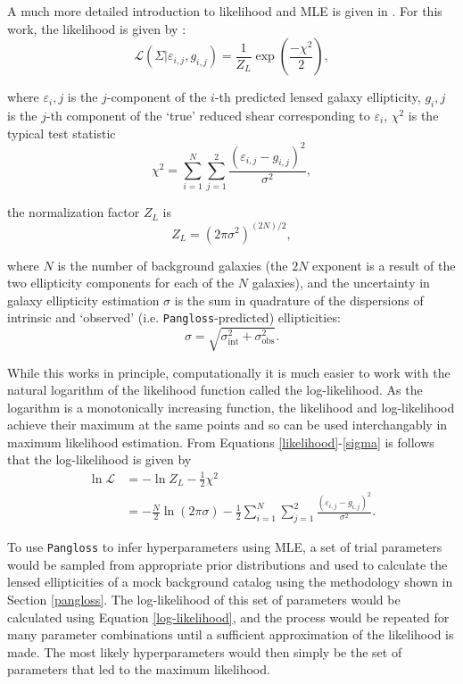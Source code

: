 \documentclass[%
 reprint,
 amsmath,amssymb,
 aps,nofootinbib
]{revtex4-1}
\begin{document}
A much more detailed introduction to likelihood and MLE is given in \cite{likelihood}. For this work, the likelihood is given by \cite{marshall_thesis}:
\begin{equation}\label{likelihood}
\mathcal{L}(\Sigma|\varepsilon_{i,j},g_{i,j})=\frac{1}{Z_L}\exp\left(\frac{-\chi^2}{2}\right),
\end{equation}

\noindent where $\varepsilon_i,j$ is the $j$-component of the $i$-th predicted lensed galaxy ellipticity, $g_i,j$ is the $j$-th component of the `true' reduced shear corresponding to $\varepsilon_i$, $\chi^2$ is the typical test statistic
\begin{equation}\label{chi2}
\chi^2=\sum_{i=1}^N\sum_{j=1}^2\frac{(\varepsilon_{i,j}-g_{i,j})^2}{\sigma^2},
\end{equation}

\noindent the normalization factor $Z_L$ is
\begin{equation}
Z_L=(2\pi\sigma^2)^{(2N)/2},
\end{equation}

\noindent where $N$ is the number of background galaxies (the $2N$ exponent is a result of the two ellipticity components for each of the $N$ galaxies), and the uncertainty in galaxy ellipticity estimation $\sigma$ is the sum in quadrature of the dispersions of intrinsic and `observed' (i.e. \texttt{Pangloss}-predicted) ellipticities:
\begin{equation}\label{sigma}
\sigma=\sqrt{\sigma_{\text{int}}^2+\sigma_{\text{obs}}^2}.
\end{equation}

While this works in principle, computationally it is much easier to work with the natural logarithm of the likelihood function called the log-likelihood. As the logarithm is a monotonically increasing function, the likelihood and log-likelihood achieve their maximum at the same points and so can be used interchangably in maximum likelihood estimation. From Equations \eqref{likelihood}-\eqref{sigma} is follows that the log-likelihood is given by
\begin{align}\label{log-likelihood}
\ln\mathcal{L}&=-\ln Z_L-\frac{1}{2}\chi^2\nonumber \\
&=-\frac{N}{2}\ln(2\pi\sigma)-\frac{1}{2}\sum_{i=1}^N\sum_{j=1}^2\frac{(\varepsilon_{i,j}-g_{i,j})^2}{\sigma^2}.
\end{align}

To use \texttt{Pangloss} to infer hyperparameters using MLE, a set of trial parameters would be sampled from appropriate prior distributions and used to calculate the lensed ellipticities of a mock background catalog using the methodology shown in Section \ref{pangloss}. The log-likelihood of this set of parameters would be calculated using Equation \eqref{log-likelihood}, and the process would be repeated for many parameter combinations until a sufficient approximation of the likelihood is made. The most likely hyperparameters would then simply be the set of parameters that led to the maximum likelihood.
\end{document}
